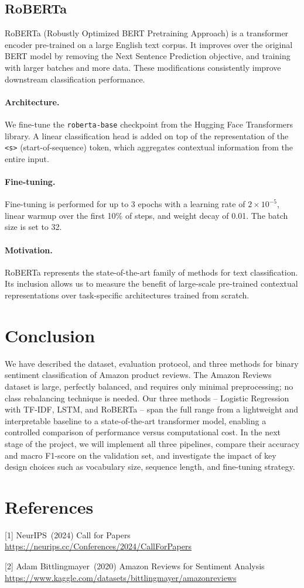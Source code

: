 \documentclass{article}
\begin{document}
\subsection{RoBERTa}

RoBERTa (Robustly Optimized BERT Pretraining Approach) 
is a transformer encoder pre-trained on a large
English text corpus.
It improves over the original BERT model by removing
the Next Sentence Prediction objective, and training with larger batches and 
more data. These modifications consistently improve downstream classification 
performance.

\paragraph{Architecture.}
We fine-tune the \texttt{roberta-base} checkpoint 
from the Hugging Face Transformers library.
A linear classification head is added on top of the representation of the
\texttt{<s>} (start-of-sequence) token, which aggregates contextual information
from the entire input.

\paragraph{Fine-tuning.}
Fine-tuning is performed for up to 3 epochs with a learning rate of
$2 \times 10^{-5}$, linear warmup over the first 10\% of steps, and weight
decay of 0.01.
The batch size is set to 32.

\paragraph{Motivation.}
RoBERTa represents the state-of-the-art family of methods for text
classification.
Its inclusion allows us to measure the benefit of large-scale pre-trained
contextual representations over task-specific architectures trained from
scratch.


\section{Conclusion}
We have described the dataset, evaluation protocol, and three methods for
binary sentiment classification of Amazon product reviews.
The Amazon Reviews dataset is large, perfectly balanced, and requires only
minimal preprocessing; no class rebalancing technique is needed.
Our three methods – Logistic Regression with TF-IDF, LSTM, and RoBERTa – 
span the full range from a lightweight and interpretable baseline to a
state-of-the-art transformer model, enabling a controlled comparison of
performance versus computational cost.
In the next stage of the project, we will implement all three pipelines,
compare their accuracy and macro F1-score on the validation set, and
investigate the impact of key design choices such as vocabulary size,
sequence length, and fine-tuning strategy.

\section*{References}

{\small
[1] NeurIPS\ (2024) Call for Papers\\ \url{https://neurips.cc/Conferences/2024/CallForPapers}

[2] Adam Bittlingmayer\ (2020) Amazon Reviews for Sentiment Analysis\\ \url{https://www.kaggle.com/datasets/bittlingmayer/amazonreviews}
}
\end{document}
